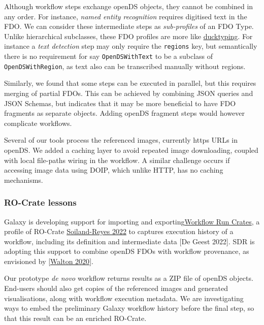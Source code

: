 Although workflow steps exchange openDS objects, they cannot be combined
in any order. For instance, \emph{named entity recognition} requires
digitised text in the FDO. We can consider these intermediate steps as
\emph{sub-profiles} of an FDO Type. Unlike hierarchical subclasses,
these FDO profiles are more like
\href{https://en.wikipedia.org/wiki/Duck_typing}{ducktyping}. For
instance a \emph{text detection} step may only require the
\texttt{regions} key, but semantically there is no requirement for say
\texttt{OpenDSWithText} to be a subclass of \texttt{OpenDSWithRegion},
as text also can be transcribed manually without regions.

Similarly, we found that some steps can be executed in parallel, but
this requires merging of partial FDOs. This can be achieved by combining
JSON queries and JSON Schemas, but indicates that it may be more
beneficial to have FDO fragments as separate objects. Adding openDS
fragment steps would however complicate workflows.

Several of our tools process the referenced images, currently https URLs
in openDS. We added a caching layer to avoid repeated image downloading,
coupled with local file-paths wiring in the workflow. A similar
challenge occurs if accessing image data using DOIP, which unlike HTTP,
has no caching mechanisms.

\hypertarget{ro-crate-lessons}{%
\subsubsection{RO-Crate lessons}\label{ro-crate-lessons}}

Galaxy is developing support for importing and
exporting\href{https://www.researchobject.org/workflow-run-crate/}{Workflow
Run Crates}, a profile of RO-Crate
\href{https://doi.org/10.3233/DS-210053}{Soiland-Reyes 2022} to
captures execution history of a workflow, including its definition and
intermediate data {[}De Geest 2022{]}. SDR is adopting this support to
combine openDS FDOs with workflow provenance, as envisioned by
{[}\href{https://doi.org/10.3897/rio.6.e57602}{Walton 2020}{]}.

Our prototype \emph{de novo} workflow returns results as a ZIP file of
openDS objects. End-users should also get copies of the referenced
images and generated visualisations, along with workflow execution
metadata. We are investigating ways to embed the preliminary Galaxy
workflow history before the final step, so that this result can be an
enriched RO-Crate.

